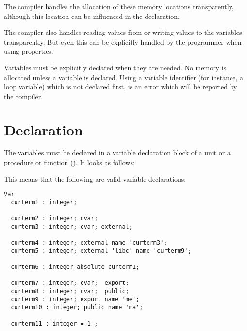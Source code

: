 The \fpc compiler handles the allocation of these memory locations
transparently, although this location can be influenced in the declaration.

The \fpc compiler also handles reading values from or writing values to
the variables transparently. But even this can be explicitly handled by the
programmer when using properties.

Variables must be explicitly declared when they are needed. No memory is
allocated unless a variable is declared. Using a variable identifier (for
instance, a loop variable) which is not declared first, is an error which
will be reported by the compiler.

\section{Declaration}
The variables must be declared in a variable declaration block of a unit
or a procedure or function (). It looks as follows:


 
This means that the following are valid variable declarations:
 
\begin{verbatim}
Var
  curterm1 : integer;

  curterm2 : integer; cvar;
  curterm3 : integer; cvar; external;

  curterm4 : integer; external name 'curterm3';
  curterm5 : integer; external 'libc' name 'curterm9';

  curterm6 : integer absolute curterm1;

  curterm7 : integer; cvar;  export;
  curterm8 : integer; cvar;  public;
  curterm9 : integer; export name 'me';
  curterm10 : integer; public name 'ma';

  curterm11 : integer = 1 ;
\end{verbatim}

